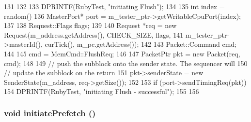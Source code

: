 \begin{DoxyCode}
131 {
132 
133     DPRINTF(RubyTest, "initiating Flush\n");
134 
135     int index = random() %
136     MasterPort* port = m_tester_ptr->getWritableCpuPort(index);
137 
138     Request::Flags flags;
139 
140     Request *req = new Request(m_address.getAddress(), CHECK_SIZE, flags,
141             m_tester_ptr->masterId(), curTick(), m_pc.getAddress());
142 
143     Packet::Command cmd;
144 
145     cmd = MemCmd::FlushReq;
146 
147     PacketPtr pkt = new Packet(req, cmd);
148 
149     // push the subblock onto the sender state.  The sequencer will
150     // update the subblock on the return
151     pkt->senderState = new SenderState(m_address, req->getSize());
152 
153     if (port->sendTimingReq(pkt)) {
154         DPRINTF(RubyTest, "initiating Flush - successful\n");
155     }
156 }
\end{DoxyCode}
\hypertarget{classCheck_aed660435c2bb1a74006597a2816f9287}{
\subsubsection[{initiatePrefetch}]{\setlength{\rightskip}{0pt plus 5cm}void initiatePrefetch ()}}
\label{classCheck_aed660435c2bb1a74006597a2816f9287}



